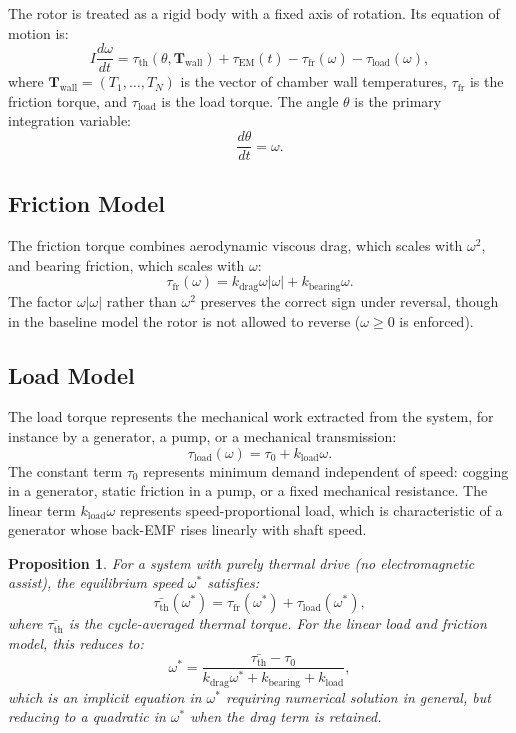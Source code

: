 \documentclass[11pt, a4paper]{article}
\theoremstyle{plain}
\newtheorem{proposition}[theorem]{Proposition}
\theoremstyle{definition}
\newcommand{\tauEM}{\tau_{\mathrm{EM}}}
\newcommand{\tauth}{\tau_{\mathrm{th}}}
\newcommand{\taufr}{\tau_{\mathrm{fr}}}
\newcommand{\tauload}{\tau_{\mathrm{load}}}
\newcommand{\om}{\omega}
\newcommand{\Nch}{N}
\begin{document}
The rotor is treated as a rigid body with a fixed axis of rotation. Its equation of motion is:
\begin{equation}
  I \frac{d\om}{dt} = \tauth(\theta, \mathbf{T}_{\mathrm{wall}}) + \tauEM(t) - \taufr(\om) - \tauload(\om),
  \label{eq:eom}
\end{equation}
where $\mathbf{T}_{\mathrm{wall}} = (T_1, \ldots, T_\Nch)$ is the vector of chamber wall temperatures, $\taufr$ is the friction torque, and $\tauload$ is the load torque. The angle $\theta$ is the primary integration variable:
\begin{equation}
  \frac{d\theta}{dt} = \om.
\end{equation}

\subsection{Friction Model}

The friction torque combines aerodynamic viscous drag, which scales with $\om^2$, and bearing friction, which scales with $\om$:
\begin{equation}
  \taufr(\om) = k_{\mathrm{drag}} \om |\om| + k_{\mathrm{bearing}} \om.
\end{equation}
The factor $\om|\om|$ rather than $\om^2$ preserves the correct sign under reversal, though in the baseline model the rotor is not allowed to reverse ($\om \geq 0$ is enforced).

\subsection{Load Model}

The load torque represents the mechanical work extracted from the system, for instance by a generator, a pump, or a mechanical transmission:
\begin{equation}
  \tauload(\om) = \tau_0 + k_{\mathrm{load}} \om.
  \label{eq:load}
\end{equation}
The constant term $\tau_0$ represents minimum demand independent of speed: cogging in a generator, static friction in a pump, or a fixed mechanical resistance. The linear term $k_{\mathrm{load}} \om$ represents speed-proportional load, which is characteristic of a generator whose back-EMF rises linearly with shaft speed.

\begin{proposition}
For a system with purely thermal drive (no electromagnetic assist), the equilibrium speed $\om^*$ satisfies:
\begin{equation}
  \bar{\tauth}(\om^*) = \taufr(\om^*) + \tauload(\om^*),
\end{equation}
where $\bar{\tauth}$ is the cycle-averaged thermal torque. For the linear load and friction model, this reduces to:
\begin{equation}
  \om^* = \frac{\bar{\tauth} - \tau_0}{k_{\mathrm{drag}} \om^* + k_{\mathrm{bearing}} + k_{\mathrm{load}}},
\end{equation}
which is an implicit equation in $\om^*$ requiring numerical solution in general, but reducing to a quadratic in $\om^*$ when the drag term is retained.
\end{proposition}
\end{document}
